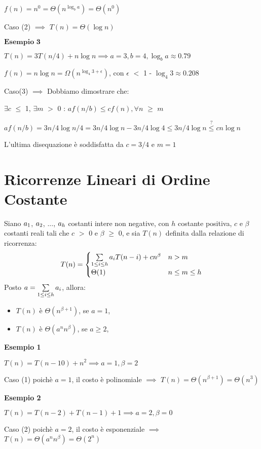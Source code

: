 \documentclass[../cheatSheetAlgoritmi.tex]{subfiles}
\begin{document}
$f(n) = n^{0} = \Theta(n^{\log_{b}{a}}) =  \Theta(n^{0})$

Caso (2) $\implies$ $T(n) = \Theta(\log{n})$

\bigskip

$\textbf{Esempio 3}$

$T(n) = 3T(n/4) + n\log{n} \implies a = 3, b = 4, \log_{b}{a} \approx 0.79$

$f(n) = n\log{n} = \Omega(n^{\log_{4}{3} + \epsilon})$, con $\epsilon$ $<$ 1 - $\log_{4}{3} \approx 0.208$

\bigskip

Caso(3) $\implies$ Dobbiamo dimostrare che:

$\exists c$ $\leq$ 1, $\exists m$ $>$ 0 : $af(n/b) \leq cf(n), \forall n$ $\geq$ $m$

$af(n/b) = 3n/4\log{n/4} = 3n/4\log{n} - 3n/4\log{4} \leq 3n/4\log{n} \stackrel{?}{\leq} cn\log{n}$

L'ultima disequazione è soddisfatta da $c = 3/4$ e $m = 1$

\section{Ricorrenze Lineari di Ordine Costante}
Siano $a\textsubscript{$1$}$, $a\textsubscript{$2$}$, $...$, $a\textsubscript{$h$}$ costanti intere non negative, con $h$ costante positiva, $c$ e $\beta$ costanti reali tali che $c$ $>$ 0 e $\beta$ $\geq$ 0, e sia $T(n)$ definita dalla relazione di ricorrenza:
	\begin{equation*}
  		T(n)=\begin{cases}
     		\sum\limits_{1 \leq i \leq h} {a \textsubscript{$i$} T(n-i)} + cn^{\beta} & \text{$n > m$}\\
    		\Theta(1) & \text{$n \leq m \leq h$}
  		\end{cases}
	\end{equation*}
Posto $a = \sum\limits_{1 \leq i \leq h} {a \textsubscript{$i$}}$, allora: 
\begin{itemize}
	\item $T(n)$ è $\Theta(n^{\beta+1})$, se $a = 1$,
	\item $T(n)$ è $\Theta(a^{n}n^{\beta})$, se $a \geq 2$,
\end{itemize}
\textbf{Esempio 1}

$T(n) = T(n - 10) + n^{2} \implies a = 1, \beta = 2$

Caso (1) poichè $a = 1$, il costo è polinomiale $\implies$ $T(n) = \Theta(n^{\beta+1}) = \Theta(n^{3})$

\bigskip

\textbf{Esempio 2}

$T(n) = T(n - 2) +  T(n - 1) + 1 \implies a = 2, \beta = 0$

Caso (2) poichè $a = 2$, il costo è esponenziale $\implies$ $T(n) = \Theta(a^{n}n^{\beta}) = \Theta(2^n)$
\end{document}
